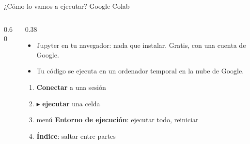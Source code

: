 \begin{frame}{¿Cómo lo vamos a ejecutar? Google Colab}
\begin{columns}[c]
\begin{column}{0.60\linewidth}
    \end{column}
    \begin{column}{0.38\linewidth}\small
      \begin{itemize}\setlength\itemsep{3pt}
        \item Jupyter en tu \alert{navegador}: nada que instalar. Gratis, con una cuenta de Google.
        \item Tu código se ejecuta en un \alert{ordenador temporal} en la nube de Google.
      \end{itemize}
      \vspace{0.1cm}
      \begin{enumerate}\setlength\itemsep{2pt}\footnotesize
        \item[\textcolor{accentred}{\textbf{1}}] \textbf{Conectar} a una sesión
        \item[\textcolor{accentred}{\textbf{2}}] $\blacktriangleright$ \textbf{ejecutar} una celda
        \item[\textcolor{accentred}{\textbf{3}}] menú \textbf{Entorno de ejecución}: ejecutar todo, reiniciar
        \item[\textcolor{accentred}{\textbf{4}}] \textbf{Índice}: saltar entre partes
      \end{enumerate}
    \end{column}
  \end{columns}
\end{frame}

